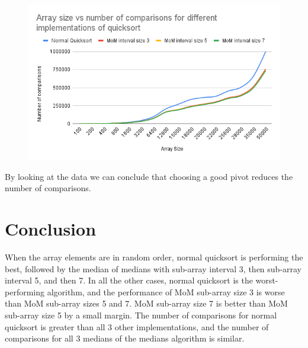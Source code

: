 \documentclass{report}
\begin{document}
\begin{figure}[H]
\centering
\includegraphics[scale=0.6]{numberofcomparisons.png}

\end{figure}


By looking at the data we can conclude that choosing a good pivot reduces the number of comparisons.

\newpage
\section*{Conclusion}


When the array elements are in random order, normal quicksort is performing the best, followed by the median of medians with sub-array interval 3, then sub-array interval 5, and then 7. In all the other cases, normal quicksort is the worst-performing algorithm, and the performance of MoM sub-array size 3 is worse than MoM sub-array sizes 5 and 7. MoM sub-array size 7 is better than MoM sub-array size 5 by a small margin. The number of comparisons for normal quicksort is greater than all 3 other implementations, and the number of comparisons for all 3 medians of the medians algorithm is similar.
\end{document}
